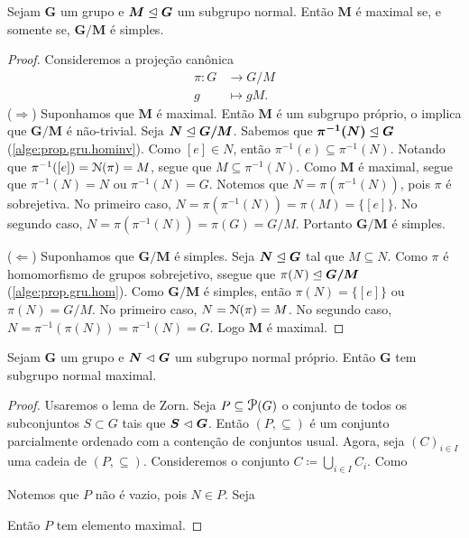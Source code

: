 \begin{prop}
Sejam $\bm G$ um grupo e $\bm M \mathrel{\unlhd} \bm G$ um subgrupo normal. Então $\bm M$ é maximal se, e somente se, $\bm{G/M}$ é simples.
\end{prop}
\begin{proof} Consideremos a projeção canônica
	\begin{align*}
	\pi: G &\to G/M \\
		 g &\mapsto gM.
	\end{align*}
($\Rightarrow$) Suponhamos que $\bm M$ é maximal. Então $\bm M$ é um subgrupo próprio, o implica que $\bm{G/M}$ é não-trivial. Seja $\bm N \mathrel{\unlhd} \bm{G/M}$. Sabemos que $\bm{\pi^{-1}(N)} \mathrel{\unlhd} \bm G$ (\ref{alge:prop.gru.hominv}). Como $[e] \in N$, então $\pi^{-1}(e) \subseteq \pi^{-1}(N)$. Notando que $\pi^{-1}([e])=\mathcal{N}(\pi) = M$, segue que $M \subseteq \pi^{-1}(N)$. Como $\bm M$ é maximal, segue que $\pi^{-1}(N) = N$ ou $\pi^{-1}(N) = G$. Notemos que $N=\pi(\pi^{-1}(N))$, pois $\pi$ é sobrejetiva. No primeiro caso, $N = \pi(\pi^{-1}(N)) = \pi(M) = \{[e]\}$. No segundo caso, $N = \pi(\pi^{-1}(N)) = \pi(G) = G/M$. Portanto $\bm{G/M}$ é simples.

\noindent
($\Leftarrow$) Suponhamos que $\bm{G/M}$ é simples. Seja $\bm N \mathrel{\unlhd} \bm G$ tal que $M \subseteq N$. Como $\pi$ é homomorfismo de grupos sobrejetivo, ssegue que $\pi(N) \mathrel{\unlhd} \bm{G/M}$ (\ref{alge:prop.gru.hom}). Como $\bm{G/M}$ é simples, então $\pi(N) = \{[e]\}$ ou $\pi(N) = G/M$. No primeiro caso, $N = \mathcal{N}(\pi) = M$. No segundo caso, $N = \pi^{-1}(\pi(N)) = \pi^{-1}(N) = G$. Logo $\bm M$ é maximal.
\end{proof}

\begin{conj}
Sejam $\bm G$ um grupo e $\bm N \mathrel{\lhd} \bm G$ um subgrupo normal próprio. Então $\bm G$ tem subgrupo normal maximal.
\end{conj}
\begin{proof}
Usaremos o lema de Zorn. Seja $P \subseteq \p(G)$ o conjunto de todos os subconjuntos $S \subset G$ tais que $\bm S \mathrel{\lhd} \bm G$. Então $(P,\subseteq)$ é um conjunto parcialmente ordenado com a contenção de conjuntos usual. Agora, seja $(C)_{i \in I}$ uma cadeia de $(P,\subseteq)$. Consideremos o conjunto $C \coloneqq \bigcup_{i \in I} C_i$. Como 

Notemos que $P$ não é vazio, pois $N \in P$. Seja 



Então $P$ tem elemento maximal.
\end{proof}






